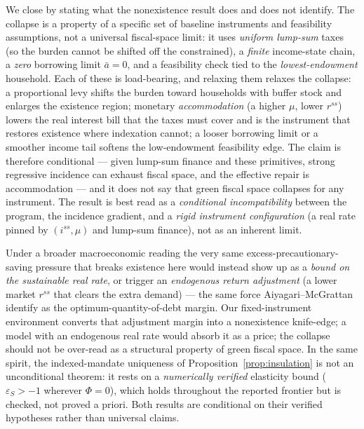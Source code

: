 \documentclass[12pt]{article}
\begin{document}
We close by stating what the nonexistence result does and does not identify.
The collapse is a property of a specific set of baseline instruments and
feasibility assumptions, not a universal fiscal-space limit: it uses
\emph{uniform lump-sum} taxes (so the burden cannot be shifted off the
constrained), a \emph{finite} income-state chain, a \emph{zero} borrowing limit
$\bar a=0$, and a feasibility check tied to the \emph{lowest-endowment}
household. Each of these is load-bearing, and relaxing them relaxes the
collapse: a proportional levy shifts the burden toward households with buffer
stock and enlarges the existence region; monetary \emph{accommodation} (a
higher $\mu$, lower $r^{ss}$) lowers the real interest bill that the taxes must
cover and is the instrument that restores existence where indexation cannot; a
looser borrowing limit or a smoother income tail softens the low-endowment
feasibility edge. The claim is therefore conditional --- given lump-sum
finance and these primitives, strong regressive incidence can exhaust
fiscal space, and the effective repair is accommodation --- and it does not
say that green fiscal space collapses for any instrument. The result is
best read as a
\emph{conditional incompatibility} between the program, the incidence gradient,
and a \emph{rigid instrument configuration} (a real rate pinned by
$(i^{ss},\mu)$ and lump-sum finance), not as an inherent limit.

Under a broader
macroeconomic reading the very same excess-precautionary-saving pressure that
breaks existence here would instead show up as a \emph{bound on the sustainable
real rate}, or trigger an \emph{endogenous return adjustment} (a lower market
$r^{ss}$ that clears the extra demand) --- the same force Aiyagari--McGrattan
identify as the optimum-quantity-of-debt margin. Our fixed-instrument
environment converts that adjustment margin into a nonexistence knife-edge; a
model with an endogenous real rate would absorb it as a price; the collapse
should not be over-read as a structural property of green fiscal space. In
the same spirit, the indexed-mandate uniqueness of
Proposition~\ref{prop:insulation} is not an unconditional theorem: it rests
on a \emph{numerically verified} elasticity bound ($\varepsilon_S>-1$
wherever $\Phi=0$), which holds throughout the reported frontier but is
checked, not proved a priori. Both results are conditional on their
verified hypotheses rather than universal claims.

\end{document}
